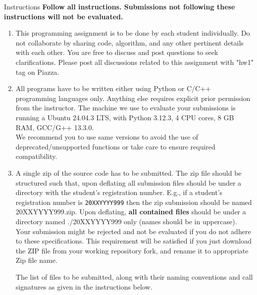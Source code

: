 \documentclass[10pt]{article}
\begin{document}
\begin{exbox}{Instructions}
\textbf{\large Follow all instructions. Submissions not following these instructions will not be evaluated.}
{\small
\begin{enumerate}
\item This programming assignment is to be done by each student individually. Do not collaborate by sharing code, algorithm, and any other pertinent details with each other. You are free to discuss and post questions to seek clarifications. Please post all discussions related to this assignment with "hw1" tag on Piazza. 
\item All programs have to be written either using Python or C/C++ programming languages only. Anything else requires explicit prior permission from the instructor. The machine we use to evaluate your submissions is running a Ubuntu 24.04.3 LTS, with Python 3.12.3, 4 CPU cores, 8 GB RAM, GCC/G++ 13.3.0.  \\
We recommend you to use same versions to avoid the use of deprecated/unsupported functions or take care to ensure required compatibility. 
\item A single zip of the source code has to be submitted. The zip file should be structured such that, upon deflating all submission files should be under a directory with the student's registration number. E.g., if a student's registration number is \texttt{20XXYYYY999} then the zip submission should be named \textsf{20XXYYYY999.zip}. Upon deflating, \textbf{all contained files} should be under a directory named \textsf{./20XXYYYY999} only (names should be in uppercase). Your submission might be rejected and not be evaluated if you do not adhere to these specifications. This requirement will be satisfied if you just download the ZIP file from your working repository fork, and rename it to appropriate Zip file name. 
		
	
	The  list of files to be submitted, along with their naming conventions and call signatures as given in the instructions below.


\end{enumerate}}
\end{exbox}
\end{document}
